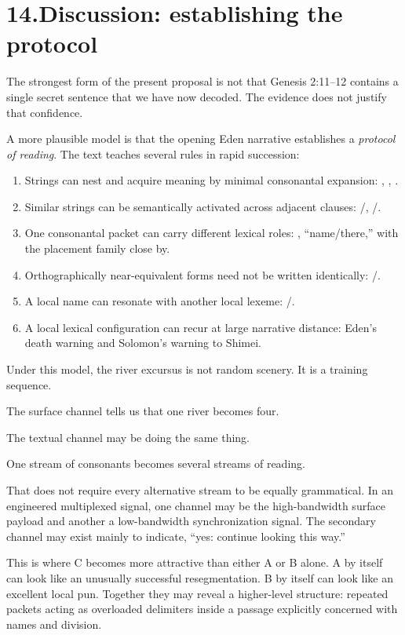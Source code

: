 \section*{14.\quad Discussion: establishing the protocol}

The strongest form of the present proposal is not that Genesis 2:11--12 contains a single secret sentence that we have now decoded.  The evidence does not justify that confidence.

A more plausible model is that the opening Eden narrative establishes a \emph{protocol of reading}.  The text teaches several rules in rapid succession:

\begin{enumerate}
\item Strings can nest and acquire meaning by minimal consonantal expansion: , , .
\item Similar strings can be semantically activated across adjacent clauses: /, /.
\item One consonantal packet can carry different lexical roles: , ``name/there,'' with the placement family close by.
\item Orthographically near-equivalent forms need not be written identically: /.
\item A local name can resonate with another local lexeme: /.
\item A local lexical configuration can recur at large narrative distance: Eden's death warning and Solomon's warning to Shimei.
\end{enumerate}

Under this model, the river excursus is not random scenery.  It is a training sequence.

The surface channel tells us that one river becomes four.

The textual channel may be doing the same thing.

One stream of consonants becomes several streams of reading.

That does not require every alternative stream to be equally grammatical.  In an engineered multiplexed signal, one channel may be the high-bandwidth surface payload and another a low-bandwidth synchronization signal.  The secondary channel may exist mainly to indicate, ``yes: continue looking this way.''

This is where C becomes more attractive than either A or B alone.  A by itself can look like an unusually successful resegmentation.  B by itself can look like an excellent local pun.  Together they may reveal a higher-level structure: repeated  packets acting as overloaded delimiters inside a passage explicitly concerned with names and division.

